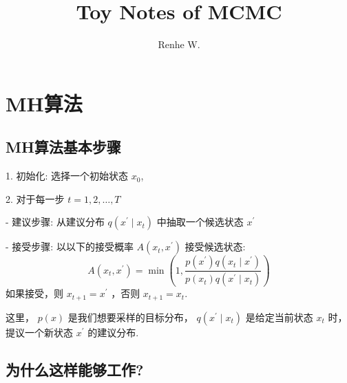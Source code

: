 \documentclass[UTF8,12pt]{ctexart}
\title{Toy Notes of MCMC}
\author{Renhe W.}
\date{ }
\numberwithin{equation}{section}%
\begin{document}
	
	\maketitle
	\tableofcontents%
	\listoffigures%
	\listoftables%
	\newpage
	\kaishu
	
	
	\section{MH算法}
	
	\subsection{MH算法基本步骤}
	\begin{tcolorbox}[enhanced]	
	
	1. 初始化: 选择一个初始状态 $x_0$,
	
	
	2. 对于每一步 $t=1,2, \ldots, T$
	
	- 建议步骤: 从建议分布 $q\left(x^{\prime} \mid x_t\right)$ 中抽取一个候选状态 $x^{\prime}$
	
	- 接受步骤: 以以下的接受概率 $A\left(x_t, x^{\prime}\right)$ 接受候选状态:
	$$
	A\left(x_t, x^{\prime}\right)=\min \left(1, \frac{p\left(x^{\prime}\right) q\left(x_t \mid x^{\prime}\right)}{p\left(x_t\right) q\left(x^{\prime} \mid x_t\right)}\right)
	$$
	如果接受，则 $x_{t+1}=x^{\prime}$ ，否则 $x_{t+1}=x_t$.
	
	这里， $p(x)$ 是我们想要采样的目标分布， $q\left(x^{\prime} \mid x_t\right)$ 是给定当前状态 $x_t$ 时，提议一个新状态 $x^{\prime}$ 的建议分布.
		
	\end{tcolorbox}

	
	\subsection{为什么这样能够工作?}
	
\end{document}
